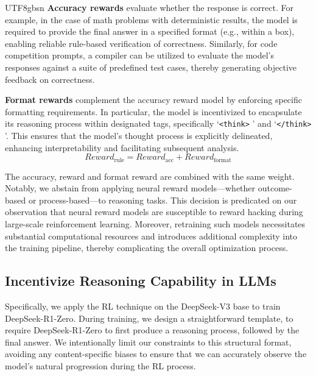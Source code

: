 \documentclass[11pt, a4paper, logo, copyright, nonumbering]{deepseek}
\begin{document}
\begin{CJK*}{UTF8}{gbsn}
\textbf{Accuracy rewards} evaluate whether the response is correct. For example, in the case of math problems with deterministic results, the model is required to provide the final answer in a specified format (e.g., within a box), enabling reliable rule-based verification of correctness. Similarly, for code competition prompts, a compiler can be utilized to evaluate the model's responses against a suite of predefined test cases, thereby generating objective feedback on correctness.

\textbf{Format rewards} complement the accuracy reward model by enforcing specific formatting requirements. In particular, the model is incentivized to encapsulate its reasoning process within designated tags, specifically `\texttt{<think>} ' and `\texttt{</think>} '. This ensures that the model's thought process is explicitly delineated, enhancing interpretability and facilitating subsequent analysis. 
\begin{equation}
    Reward_\text{rule} = Reward_\text{acc} + Reward_\text{format}
\end{equation}

The accuracy, reward and format reward are combined with the same weight. 
Notably, we abstain from applying neural reward models—whether outcome-based or process-based—to reasoning tasks. This decision is predicated on our observation that neural reward models are susceptible to reward hacking during large-scale reinforcement learning. Moreover, retraining such models necessitates substantial computational resources and introduces additional complexity into the training pipeline, thereby complicating the overall optimization process.

\subsection{Incentivize Reasoning Capability in LLMs}
Specifically, we apply the RL technique on the DeepSeek-V3 base to train DeepSeek-R1-Zero. During training, we design a straightforward template, to require DeepSeek-R1-Zero to first produce a reasoning process, followed by the final answer. We intentionally limit our constraints to this structural format, avoiding any content-specific biases to ensure that we can accurately observe the model's natural progression during the RL process.


\end{CJK*}
\end{document}

